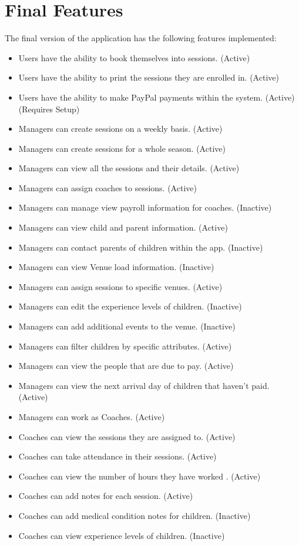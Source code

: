 \documentclass{l3proj}
\begin{document}
\section{Final Features}
The final version of the application has the following features implemented:
\begin{itemize}
\item Users have the ability to book themselves into sessions. (Active)
\item Users have the ability to print the sessions they are enrolled in. (Active)
\item Users have the ability to make PayPal payments within the system. (Active) (Requires Setup)
\item Managers can create sessions on a weekly basis. (Active)
\item Managers can create sessions for a whole season. (Active)
\item Managers can view all the sessions and their details. (Active)
\item Managers can assign coaches to sessions. (Active)
\item Managers can manage view payroll information for coaches. (Inactive)
\item Managers can view child and parent information. (Active)
\item Managers can contact parents of children within the app. (Inactive)
\item Managers can view Venue load information. (Inactive)
\item Managers can assign sessions to specific venues. (Active)
\item Managers can edit the experience levels of children. (Inactive)
\item Managers can add additional events to the venue. (Inactive)
\item Managers can filter children by specific attributes. (Active)
\item Managers can view the people that are due to pay. (Active)
\item Managers can view the next arrival day of children that haven't paid. (Active)
\item Managers can work as Coaches. (Active)
\item Coaches can view the sessions they are assigned to. (Active)
\item Coaches can take attendance in their sessions. (Active)
\item Coaches can view the number of hours they have worked . (Active)
\item Coaches can add notes for each session. (Active)
\item Coaches can add medical condition notes for children. (Inactive)
\item Coaches can view experience levels of children. (Inactive)
\end{itemize}
\end{document}
